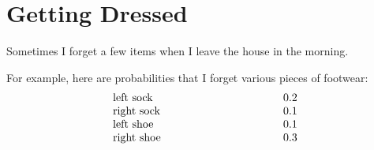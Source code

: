 \documentclass[12pt]{article}
\begin{document}

\newpage

\section{Getting Dressed}
Sometimes I forget a few items when I leave the house in the morning.

 For example, here are probabilities that I forget various
pieces of footwear:
%
\[
\begin{array}{p{2in}l}
left sock & 0.2 \\
right sock & 0.1 \\
left shoe & 0.1 \\
right shoe & 0.3
\end{array}
\]
%
\end{document}
